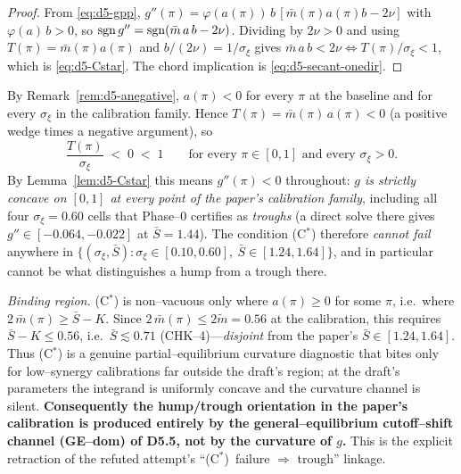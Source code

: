 \begin{proof}
From \eqref{eq:d5-gpp}, $g''(\pi)=\varphi(a(\pi))\,b\,[\bar m(\pi)a(\pi)b-2\nu]$
with $\varphi(a)\,b>0$, so $\operatorname{sgn} g''=\operatorname{sgn}(\bar m\,a\,b-2\nu)$. Dividing by
$2\nu>0$ and using $T(\pi)=\bar m(\pi)a(\pi)$ and $b/(2\nu)=1/\sigma_\xi$ gives
$\bar m\,a\,b<2\nu\iff T(\pi)/\sigma_\xi<1$, which is \eqref{eq:d5-Cstar}. The
chord implication is \eqref{eq:d5-secant-onedir}.
\end{proof}

\begin{remark}\label{rem:d5-vacuous}
By Remark~\ref{rem:d5-anegative}, $a(\pi)<0$ for every $\pi$ at the baseline and
for every $\sigma_\xi$ in the calibration family. Hence
$T(\pi)=\bar m(\pi)\,a(\pi)<0$ (a positive wedge times a negative argument), so
\[
  \frac{T(\pi)}{\sigma_\xi}\;<\;0\;<\;1
  \qquad\text{for every }\pi\in[0,1]\text{ and every }\sigma_\xi>0 .
\]
By Lemma~\ref{lem:d5-Cstar} this means $g''(\pi)<0$ throughout: \emph{$g$ is
strictly concave on $[0,1]$ at every point of the paper's calibration family},
including all four $\sigma_\xi=0.60$ cells that Phase--0 certifies as
\emph{troughs} (a direct solve there gives $g''\in[-0.064,-0.022]$ at
$\bar S=1.44$). %
The condition (C$^\ast$) therefore \emph{cannot fail} anywhere in
$\{(\sigma_\xi,\bar S):\sigma_\xi\in[0.10,0.60],\ \bar S\in[1.24,1.64]\}$, and
in particular cannot be what distinguishes a hump from a trough there.

\emph{Binding region.} (C$^\ast$) is non--vacuous only where $a(\pi)\ge0$ for
some $\pi$, i.e.\ where $2\,\bar m(\pi)\ge \bar S-K$. Since
$2\,\bar m(\pi)\le 2\tilde m=0.56$ at the calibration, this requires
$\bar S-K\le 0.56$, i.e.\ $\bar S\lesssim 0.71$ (CHK--4)---\emph{disjoint} from
the paper's $\bar S\in[1.24,1.64]$. Thus (C$^\ast$) is a genuine
partial--equilibrium curvature diagnostic that bites only for low--synergy
calibrations far outside the draft's region; at the draft's parameters the
integrand is uniformly concave and the curvature channel is silent.
\textbf{Consequently the hump/trough orientation in the paper's calibration is
produced entirely by the general--equilibrium cutoff--shift channel
(GE--dom) of D5.5, not by the curvature of $g$.} This is the explicit
retraction of the refuted attempt's ``(C$^\ast$)~failure $\Rightarrow$
trough'' linkage. %
\end{remark}

